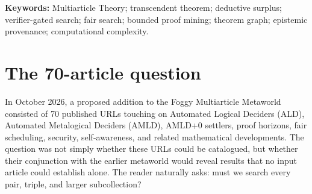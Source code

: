\documentclass[11pt,letterpaper]{article}
\newcommand{\Fair}{\textsc{FAIR-ZIP}}
\begin{document}
\begin{abstract}
A multiarticle joins the theorem graphs of distinct articles through declared, proof-carrying interfaces. Its most distinctive discoveries are \emph{transcendent theorems}: propositions derivable in the combined consequence closure but not derivable from the consequence closure of any individual input. Exhaustive search across many articles is difficult for reasons extending beyond the number of pairs: deductive closures may be infinite, compatibility depends on justified translations, and proving individual non-derivability can be undecidable. This paper contrasts a brute-force program with \Fair, a reduced-search algorithm that mandates a substantive first examination of every input, mines bounded local low-fan-in consequences, ensures fair opportunities for cross-article pairing, and then prioritizes selected proof-carrying zips. The compression analogy is deliberately asymmetric: like a perceptual codec, the algorithm can omit potentially interesting parts of the search space, but it is not allowed to degrade any accepted theorem, certificate, hypothesis, or provenance record. In the 70-URL settler case there are exactly 2,415 unordered pairs and 54,740 triples. A budget of 100--200 deep pairwise investigations eliminates 91.7--95.9\% of pairwise investigations. An explicit weighted model instead gives 72.7--76.0\% total saving when first-pass examinations are relatively expensive. We prove coverage and soundness properties, exhibit the inevitable loss of recall, and specify the conditions under which complete bounded-fragment certification remains possible.
\end{abstract}
\noindent\textbf{Keywords:} Multiarticle Theory; transcendent theorem; deductive surplus; verifier-gated search; fair search; bounded proof mining; theorem graph; epistemic provenance; computational complexity.

\section{The 70-article question}
In October 2026, a proposed addition to the Foggy Multiarticle Metaworld consisted of 70 published URLs touching on Automated Logical Deciders (ALD), Automated Metalogical Deciders (AMLD), AMLD+0 settlers, proof horizons, fair scheduling, security, self-awareness, and related mathematical developments. The question was not simply whether these URLs could be catalogued, but whether their conjunction with the earlier metaworld would reveal results that no input article could establish alone. The reader naturally asks: must we search every pair, triple, and larger subcollection?
\end{document}
